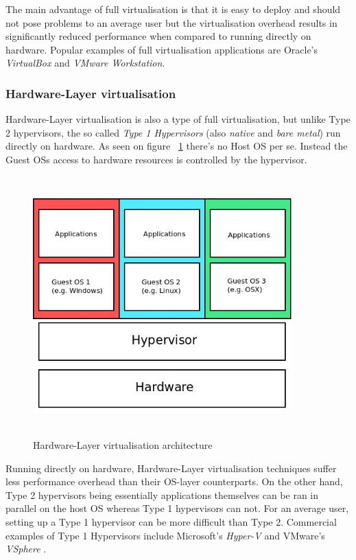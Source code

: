 The main advantage of full virtualisation is that it is easy to deploy and should not pose problems to an average user but the virtualisation overhead results in significantly reduced performance when compared to running directly on hardware. Popular examples of full virtualisation applications are Oracle's \textit{VirtualBox}\cite{VirtualBox} and \textit{VMware Workstation}\cite{WorkStation}. 

\subsubsection{Hardware-Layer virtualisation}

Hardware-Layer virtualisation is also a type of full virtualisation, but unlike Type 2 hypervisors, the so called \textit{Type 1 Hypervisors} (also \textit{native} and \textit{bare metal}) run directly on hardware. As seen on figure ~\ref{fig:hardware} there's no Host OS per se. Instead the Guest OSs access to hardware resources is controlled by the hypervisor.

\begin{figure}[ht!]
\centering
  \includegraphics[width=10cm,height=10cm, keepaspectratio]{hwlayer.jpeg}%
  \caption{Hardware-Layer virtualisation architecture}
  \label{fig:hardware}
\end{figure}

Running directly on hardware, Hardware-Layer virtualisation techniques suffer less performance overhead than their OS-layer counterparts. On the other hand, Type 2 hypervisors being essentially applications themselves can be ran in parallel on the host OS whereas Type 1 hypervisors can not. For an average user, setting up a Type 1 hypervisor can be more difficult than Type 2. Commercial examples of Type 1 Hypervisors include Microsoft's \textit{Hyper-V}\cite{hyperv} and VMware's \textit{VSphere} \cite{vsphere}.

